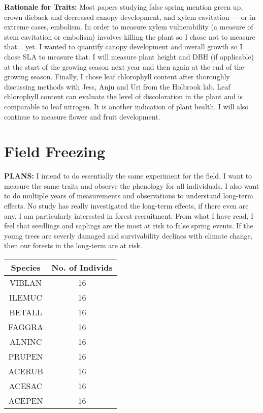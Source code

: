 \documentclass{article}\usepackage[]{graphicx}\usepackage[]{color}
\begin{document}
\textbf{Rationale for Traits:} Most papers studying false spring mention green up, crown dieback and decreased canopy development, and xylem cavitation --- or in extreme cases, embolism. In order to measure xylem vulnerability (a measure of stem cavitation or embolism) involves killing the plant so I chose not to measure that... yet. I wanted to quantify canopy development and overall growth so I chose SLA to measure that. I will measure plant height and DBH (if applicable) at the start of the growing season next year and then again at the end of the growing season. Finally, I chose leaf chlorophyll content after thoroughly discussing methods with Jess, Anju and Uri from the Holbrook lab. Leaf chlorophyll content can evaluate the level of discoloration in the plant and is comparable to leaf nitrogen. It is another indication of plant health. I will also continue to measure flower and fruit development.

\section*{Field Freezing}

\textbf{PLANS:} I intend to do essentially the same experiment for the field. I want to measure the same traits and observe the phenology for all individuals. I also want to do multiple years of measurements and observations to understand long-term effects. No study has really investigated the long-term effects, if there even are any. I am particularly interested in forest recruitment. From what I have read, I feel that seedlings and saplings are the most at risk to false spring events. If the young trees are severly damaged and survivability declines with climate change, then our forests in the long-term are at risk. 

\begin{center}
 \label{tab:grant} 
\footnotesize
\begin{tabular}{|c | c |}
\hline
\textbf{Species} & \textbf{No. of Individs} \\
\hline
VIBLAN & 16 \\
\hline
ILEMUC & 16 \\
\hline
BETALL & 16 \\
\hline
FAGGRA & 16 \\
\hline
ALNINC & 16 \\
\hline
PRUPEN & 16 \\
\hline
ACERUB & 16 \\
\hline
ACESAC & 16 \\
\hline
ACEPEN & 16 \\
\hline
\end{tabular}
\end{center}
\end{document}
